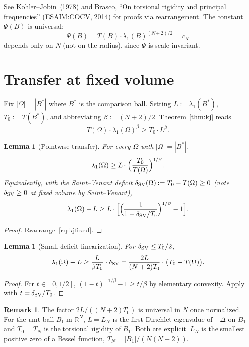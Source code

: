 \documentclass[11pt]{article}
\newtheorem{lemma}[theorem]{Lemma}
\theoremstyle{definition}
\newtheorem{remark}[theorem]{Remark}
\newcommand{\R}{\mathbb{R}}
\newcommand{\abs}[1]{\left|#1\right|}
\begin{document}
See Kohler--Jobin~(1978) and Brasco, ``On torsional rigidity and principal
frequencies'' (ESAIM:COCV, 2014) for proofs via rearrangement. The constant
$\Psi(B)$ is universal:
\[
\Psi(B)=T(B)\cdot\lambda_1(B)^{(N+2)/2}=c_N
\]
depends only on $N$ (not on the radius), since $\Psi$ is scale-invariant.

\section{Transfer at fixed volume}\label{sec:transfer}

Fix $\abs{\Omega}=\abs{B^*}$ where $B^*$ is the comparison ball. Setting
$L:=\lambda_1(B^*)$, $T_0:=T(B^*)$, and abbreviating $\beta:=(N+2)/2$,
Theorem~\ref{thm:kj} reads
\begin{equation}\label{eq:kjfixed}
T(\Omega)\cdot\lambda_1(\Omega)^\beta\ge T_0\cdot L^\beta.
\end{equation}

\begin{lemma}[Pointwise transfer]\label{lem:pointwise}
For every $\Omega$ with $\abs{\Omega}=\abs{B^*}$,
\[
\lambda_1(\Omega)\ge L\cdot\Bigl(\frac{T_0}{T(\Omega)}\Bigr)^{1/\beta}.
\]
Equivalently, with the Saint--Venant deficit
$\delta_{\rm SV}(\Omega):=T_0-T(\Omega)\ge0$ (note $\delta_{\rm SV}\ge0$ at fixed volume by
Saint--Venant),
\[
\lambda_1(\Omega)-L\ge L\cdot\Bigl[\Bigl(\frac{1}{1-\delta_{\rm SV}/T_0}\Bigr)^{1/\beta}-1\Bigr].
\]
\end{lemma}

\begin{proof}
Rearrange~\eqref{eq:kjfixed}.
\end{proof}

\begin{lemma}[Small-deficit linearization]\label{lem:linear}
For $\delta_{\rm SV}\le T_0/2$,
\[
\lambda_1(\Omega)-L\ge\frac{L}{\beta T_0}\cdot\delta_{\rm SV}
=\frac{2L}{(N+2)T_0}\cdot\bigl(T_0-T(\Omega)\bigr).
\]
\end{lemma}

\begin{proof}
For $t\in[0,1/2]$,
$(1-t)^{-1/\beta}-1\ge t/\beta$ by elementary convexity. Apply with
$t=\delta_{\rm SV}/T_0$.
\end{proof}

\begin{remark}
The factor $2L/((N+2)T_0)$ is universal in $N$ once normalized. For the unit
ball $B_1$ in $\R^N$, $L=L_N$ is the first Dirichlet eigenvalue of $-\Delta$
on $B_1$ and $T_0=T_N$ is the torsional rigidity of $B_1$. Both are explicit:
$L_N$ is the smallest positive zero of a Bessel function, $T_N=\abs{B_1}/(N(N+2))$.
\end{remark}
\end{document}
